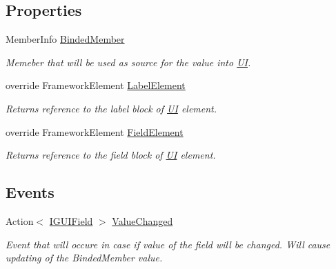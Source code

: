 \subsection*{Properties}
\begin{DoxyCompactItemize}
\item 
Member\+Info \mbox{\hyperlink{class_wpf_handler_1_1_u_i_1_1_controls_1_1_flat_text_box_ae99e62202c09fb6f5e4ecd452c092ba0}{Binded\+Member}}
\begin{DoxyCompactList}\small\item\em Memeber that will be used as source for the value into \mbox{\hyperlink{namespace_wpf_handler_1_1_u_i}{UI}}. \end{DoxyCompactList}\item 
override Framework\+Element \mbox{\hyperlink{class_wpf_handler_1_1_u_i_1_1_controls_1_1_flat_text_box_ad48de4d845ba738fe0797c3b63625def}{Label\+Element}}
\begin{DoxyCompactList}\small\item\em Returns reference to the label block of \mbox{\hyperlink{namespace_wpf_handler_1_1_u_i}{UI}} element. \end{DoxyCompactList}\item 
override Framework\+Element \mbox{\hyperlink{class_wpf_handler_1_1_u_i_1_1_controls_1_1_flat_text_box_a07aad5ace193dc2627b760a7657c170b}{Field\+Element}}
\begin{DoxyCompactList}\small\item\em Returns reference to the field block of \mbox{\hyperlink{namespace_wpf_handler_1_1_u_i}{UI}} element. \end{DoxyCompactList}\end{DoxyCompactItemize}
\subsection*{Events}
\begin{DoxyCompactItemize}
\item 
Action$<$ \mbox{\hyperlink{interface_wpf_handler_1_1_u_i_1_1_auto_layout_1_1_i_g_u_i_field}{I\+G\+U\+I\+Field}} $>$ \mbox{\hyperlink{class_wpf_handler_1_1_u_i_1_1_controls_1_1_flat_text_box_a105a5e83858eda13ef8010240747203e}{Value\+Changed}}
\begin{DoxyCompactList}\small\item\em Event that will occure in case if value of the field will be changed. Will cause updating of the Binded\+Member value. \end{DoxyCompactList}\end{DoxyCompactItemize}
